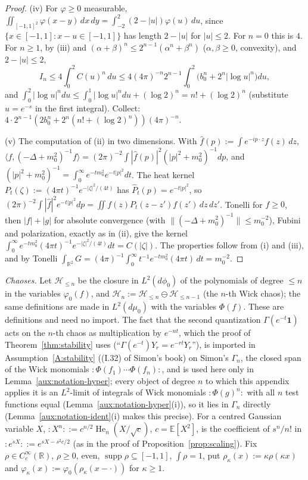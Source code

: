 \documentclass[11pt,a4paper]{article}
\theoremstyle{plain}
\theoremstyle{definition}
\theoremstyle{plain}
\theoremstyle{definition}
\newcommand{\R}{\mathbb{R}}
\newcommand{\E}{\mathbb{E}}
\newcommand{\ip}[2]{\langle #1,#2\rangle}
\DeclareMathOperator{\supp}{supp}
\newcommand{\dmu}{d\mu_0}
\newcommand{\dphi}{d\phi_0}
\begin{document}
\begin{proof}
(iv) For $\varphi\ge0$ measurable, $\iint_{[-1,1]^2}\varphi(x-y)\,dx\,dy=\int_{-2}^2(2-|u|)
\varphi(u)\,du$, since $\{x\in[-1,1]:x-u\in[-1,1]\}$ has length $2-|u|$ for $|u|\le2$.  For
$n=0$ this is $4$.  For $n\ge1$, by (iii) and $(\alpha+\beta)^n\le2^{n-1}(\alpha^n+\beta^n)$
($\alpha,\beta\ge0$, convexity), and $2-|u|\le2$,
\[
 I_n\le4\int_0^2C(u)^n\,du\le4(4\pi)^{-n}2^{n-1}\int_0^2\bigl(b_0^n+2^n|\log u|^n\bigr)du ,
\]
and $\int_0^2|\log u|^ndu\le\int_0^1|\log u|^ndu+(\log2)^n=n!+(\log2)^n$ (substitute $u=e^{-s}$
in the first integral).  Collect: $4\cdot2^{n-1}(2b_0^n+2^n(n!+(\log2)^n))(4\pi)^{-n}$.

(v) The computation of (ii) in two dimensions.  With $\hat f(p):=\int e^{-ip\cdot z}f(z)\,dz$,
$\ip f{(-\Delta+m_0^2)^{-1}f}=(2\pi)^{-2}\int|\hat f(p)|^2(|p|^2+m_0^2)^{-1}dp$, and
$(|p|^2+m_0^2)^{-1}=\int_0^\infty e^{-tm_0^2}e^{-t|p|^2}dt$.  The heat kernel
$P_t(\zeta):=(4\pi t)^{-1}e^{-|\zeta|^2/(4t)}$ has $\hat P_t(p)=e^{-t|p|^2}$, so
$(2\pi)^{-2}\int|\hat f|^2e^{-t|p|^2}dp=\iint f(z)P_t(z-z')f(z')\,dz\,dz'$.  Tonelli for $f\ge0$,
then $|f|+|g|$ for absolute convergence (with $\|(-\Delta+m_0^2)^{-1}\|\le m_0^{-2}$), Fubini and
polarization, exactly as in (ii), give the kernel
$\int_0^\infty e^{-tm_0^2}(4\pi t)^{-1}e^{-|\zeta|^2/(4t)}dt=C(|\zeta|)$.  The properties follow
from (i) and (iii), and by Tonelli
$\int_{\R^2}G=(4\pi)^{-1}\int_0^\infty t^{-1}e^{-tm_0^2}(4\pi t)\,dt=m_0^{-2}$.
\end{proof}

\emph{Chaoses.}  Let $\mathcal H_{\le n}$ be the closure in $L^2(\dphi)$ of the polynomials
of degree $\le n$ in the variables $\varphi_0(f)$, and $\mathcal H_n:=\mathcal
H_{\le n}\ominus\mathcal H_{\le n-1}$ (the $n$-th Wick chaos); the same definitions are made in
$L^2(\dmu)$ with the variables $\Phi(f)$.  These are definitions and need no import.  The fact
that the second quantization $\Gamma(e^{-t}\mathbf 1)$ acts on the $n$-th chaos as
multiplication by $e^{-nt}$, which the proof of Theorem~\ref{thm:stability} uses
(``$\Gamma(e^{-t})Y_r=e^{-rt}Y_r$''), is imported in Assumption~\ref{A:stability} ((I.32) of
Simon's book) on Simon's $\Gamma_n$, the closed span of the Wick monomials
${:}\Phi(f_1)\cdots\Phi(f_n){:}$, and is used here only in Lemma~\ref{aux:notation-hyper}; every
object of degree $n$ to which this appendix applies it is an $L^2$-limit of integrals of Wick
monomials ${:}\Phi(g)^n{:}$ with all $n$ test functions equal (Lemma~\ref{aux:notation-hyper}(i)),
so it lies in $\Gamma_n$ directly (Lemma~\ref{aux:notation-ident}(i) makes this precise).  For a centred
Gaussian variable $X$, ${:}X^n{:}:=c^{n/2}\operatorname{He}_n(X/\sqrt c)$, $c=\E[X^2]$, is
the coefficient of $s^n/n!$ in ${:}e^{sX}{:}:=e^{sX-s^2c/2}$ (as in the proof of
Proposition~\ref{prop:scaling}).  Fix $\rho\in C_c^\infty(\R)$, $\rho\ge0$, even, $\supp
\rho\subseteq[-1,1]$, $\int\rho=1$, put $\rho_\kappa(x):=\kappa\rho(\kappa x)$ and
$\varphi_\kappa(x):=\varphi_0(\rho_\kappa(x-\cdot))$ for $\kappa\ge1$.
\end{document}
